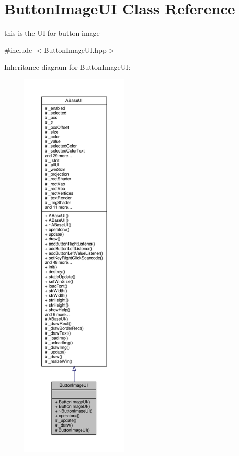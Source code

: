 \hypertarget{class_button_image_u_i}{}\section{Button\+Image\+UI Class Reference}
\label{class_button_image_u_i}


this is the UI for button image  




{\ttfamily \#include $<$Button\+Image\+U\+I.\+hpp$>$}



Inheritance diagram for Button\+Image\+UI\+:
\nopagebreak
\begin{figure}[H]
\begin{center}
\leavevmode
\includegraphics[height=550pt]{class_button_image_u_i__inherit__graph}
\end{center}
\end{figure}


